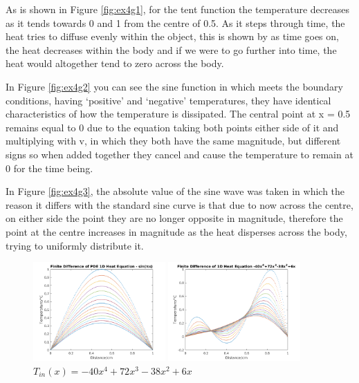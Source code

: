 \documentclass[11pt,a4paper]{article}
\begin{document}
As is shown in Figure \ref{fig:ex4g1}, for the tent function the temperature decreases as it tends towards 0 and 1 from the centre of 0.5. As it steps through time, the heat tries to diffuse evenly within the object, this is shown by as time goes on, the heat decreases within the body and if we were to go further into time, the heat would altogether tend to zero across the body.

\vspace{3mm}In Figure \ref{fig:ex4g2} you can see the sine function in which meets the boundary conditions, having `positive' and `negative' temperatures, they have identical characteristics of how the temperature is dissipated. The central point at x = 0.5 remains equal to 0 due to the equation taking both points either side of it and multiplying with v, in which they both have the same magnitude, but different signs so when added together they cancel and cause the temperature to remain at 0 for the time being.

\vspace{3mm}In Figure \ref{fig:ex4g3}, the absolute value of the sine wave was taken in which the reason it differs with the standard sine curve is that due to now across the centre, on either side the point they are no longer opposite in magnitude, therefore the point at the centre increases in magnitude as the heat disperses across the body, trying to uniformly distribute it.

\pagebreak

\begin{figure}
	\includegraphics[width=0.45\textwidth]{Ex4_Figs/sinpi.png}
	\vspace{-3mm}
	\caption{$T_{in}(x)= sin(\pi x)$}
	\label{fig:ex4g4}
		\includegraphics[width=0.45\textwidth]{Ex4_Figs/poly.png}
		\vspace{-3mm}
	\caption{$T_{in}(x)= -40x^4 +72x^3 -38x^2 +6x$}
	\label{fig:ex4g5}
\end{figure}
\end{document}
